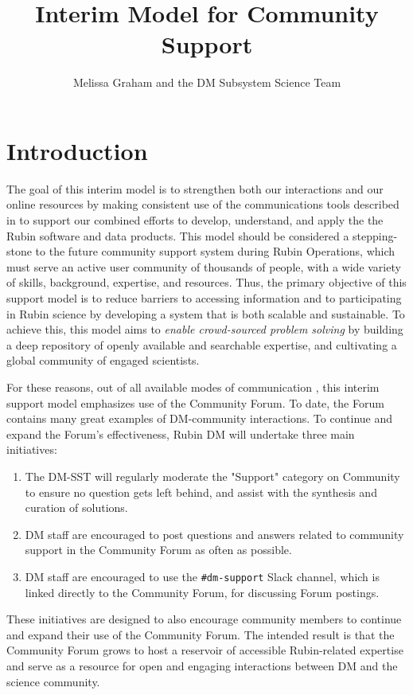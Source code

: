 \documentclass[DM,lsstdraft,authoryear,toc]{lsstdoc}
\title{Interim Model for Community Support}
\author{%
Melissa Graham and the DM Subsystem Science Team
}
\date{\vcsDate}
\begin{document}
\maketitle

\section{Introduction} \label{sec:intro}

The goal of this interim model is to strengthen both our interactions and our online resources by making consistent use of the communications tools described in  to support our combined efforts to develop, understand, and apply the the Rubin software and data products. 
This model should be considered a stepping-stone to the future community support system during Rubin Operations, which must serve an active user community of thousands of people, with a wide variety of skills, background, expertise, and resources.
Thus, the primary objective of this support model is to reduce barriers to accessing information and to participating in Rubin science by developing a system that is both scalable and sustainable.
To achieve this, this model aims to {\it enable crowd-sourced problem solving} by building a deep repository of openly available and searchable expertise, and cultivating a global community of engaged scientists.

For these reasons, out of all available modes of communication , this interim support model emphasizes use of the Community Forum. To date, the Forum contains many great examples of DM-community interactions. To continue and expand the Forum's effectiveness, Rubin DM will undertake three main initiatives: 
\begin{enumerate}
\item The DM-SST will regularly moderate the "Support" category on Community to ensure no question gets left behind, and assist with the synthesis and curation of solutions.
\item DM staff are encouraged to post questions and answers related to community support in the Community Forum as often as possible.
\item DM staff are encouraged to use the {\tt \#dm-support} Slack channel, which is linked directly to the Community Forum, for discussing Forum postings. 
\end{enumerate}
These initiatives are designed to also encourage community members to continue and expand their use of the Community Forum.
The intended result is that the Community Forum grows to host a reservoir of accessible Rubin-related expertise and serve as a resource for open and engaging interactions between DM and the science community. 
\end{document}
